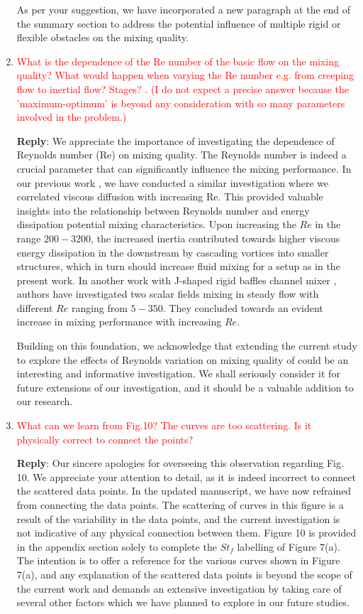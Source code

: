 \documentclass[onecolumn,a4paper,amsmath,amssym,pre]{revtex4}
\begin{document}
\begin{enumerate}
					As per your suggestion, we have incorporated a new paragraph at the end of the summary section to address the potential influence of multiple rigid or flexible obstacles on the mixing quality. 
					
					\item \textcolor{red}{What is the dependence of the Re number of the basic flow on the mixing quality? What would happen when varying the Re number e.g. from creeping flow to inertial flow? Stages?
						. (I do not expect a precise answer because the 'maximum-optimum' is beyond any consideration with so many parameters involved in the problem.)}
					
					\textbf{Reply}: We appreciate the importance of investigating the dependence of Reynolds number (Re) on mixing quality. The Reynolds number is indeed a crucial parameter that can significantly influence the mixing performance. In our previous work \cite{Self2019}, we have conducted a similar investigation where we correlated viscous diffusion with increasing Re. This provided valuable insights into the relationship between Reynolds number and energy dissipation potential mixing characteristics. Upon increasing the $Re$ in the range $200-3200$, the increased inertia contributed towards higher viscous energy dissipation in the downstream by cascading vortices into smaller structures, which in turn should increase fluid mixing for a setup as in the present work. In another work with J-shaped rigid baffles channel mixer \cite{Lin2007}, authors have investigated two scalar fields mixing in steady flow with different $Re$ ranging from $5-350$. They concluded towards an evident increase in mixing performance with increasing $Re$.
					
					Building on this foundation, we acknowledge that extending the current study to explore the effects of Reynolds variation on mixing quality of could be an interesting and informative investigation. We shall seriously consider it for future extensions of our investigation, and it should be a valuable addition to our research.
					
					\item \textcolor{red}{What can we learn from Fig.10? The curves are too scattering. Is it physically correct to connect the points?}
					
					\textbf{Reply}: Our sincere apologies for overseeing this observation regarding Fig. 10. We appreciate your attention to detail, as it is indeed incorrect to connect the scattered data points. In the updated manuscript, we have now refrained from connecting the data points. The scattering of curves in this figure is a result of the variability in the data points, and the current investigation is not indicative of any physical connection between them. 	
					Figure 10 is provided in the appendix section solely to complete the $St_f$ labelling of Figure 7(a). The intention is to offer a reference for the various curves shown in Figure 7(a), and any explanation of the scattered data points is beyond the scope of the current work and demands an extensive investigation by taking care of several other factors which we have planned to explore in our future studies.
					

\end{enumerate}
\end{document}
